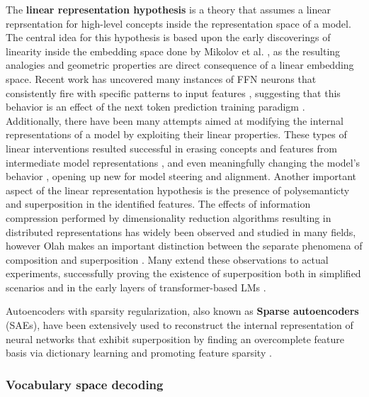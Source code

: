 The \textbf{linear representation hypothesis}  is a theory that assumes a linear reprsentation for high-level concepts inside the representation space of a model.
The central idea for this hypothesis is based upon the early discoverings of linearity inside the embedding space done by Mikolov et al. \cite{mikolov2013}, as the resulting analogies and geometric properties are direct consequence of a linear embedding space.
Recent work has uncovered many instances of FFN neurons that consistently fire with specific patterns  to input features , suggesting that this behavior is an effect of the next token prediction training paradigm .
Additionally, there have been many attempts aimed at modifying the internal representations of a model by exploiting their linear properties.
These types of linear interventions resulted successful in erasing concepts and features from intermediate model representations , and even meaningfully changing the model's behavior , opening up new  for model steering and alignment. 
Another important aspect of the linear representation hypothesis is the presence of polysemanticty and superposition in the identified features.
The effects of information compression performed by dimensionality reduction algorithms resulting in distributed representations has widely been observed and studied in many fields, however Olah makes an important distinction between the separate phenomena of composition and superposition .
Many extend these observations to actual experiments, successfully proving the existence of superposition both in simplified scenarios  and in the early layers of transformer-based LMs .


Autoencoders with sparsity regularization, also known as \textbf{Sparse autoencoders} (SAEs), have been extensively used to reconstruct the internal representation of neural networks that exhibit superposition by finding an overcomplete feature basis via dictionary learning and promoting feature sparsity .

\subsubsection{Vocabulary space decoding}

